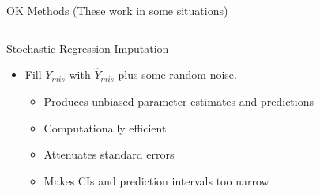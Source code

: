\documentclass{beamer}\usepackage[]{graphicx}\usepackage[]{color}
\makeatletter
\newenvironment{kframe}{%
 \def\at@end@of@kframe{}%
 \ifinner\ifhmode%
  \def\at@end@of@kframe{\end{minipage}}%
  \begin{minipage}{\columnwidth}%
 \fi\fi%
 \def\FrameCommand##1{\hskip\@totalleftmargin \hskip-\fboxsep
 \colorbox{shadecolor}{##1}\hskip-\fboxsep
     \hskip-\linewidth \hskip-\@totalleftmargin \hskip\columnwidth}%
 \MakeFramed {\advance\hsize-\width
   \@totalleftmargin\z@ \linewidth\hsize
   \@setminipage}}%
 {\par\unskip\endMakeFramed%
 \at@end@of@kframe}
\newenvironment{knitrout}{}{} %
\makeatother
\begin{document}
\begin{frame}{OK Methods (These work in some situations)}
  
  \begin{columns}
    \begin{column}{0.5\textwidth}
      
      Stochastic Regression Imputation
      \vc
      \begin{itemize}
      \item Fill $Y_{mis}$ with $\widehat{Y}_{mis}$ plus some random noise.
        \vc
        \begin{itemize}
        \item Produces unbiased parameter estimates and predictions
          \vc
        \item Computationally efficient
          \vc
        \item Attenuates standard errors
          \vc
        \item Makes CIs and prediction intervals too narrow
        \end{itemize}
      \end{itemize}
      
    \end{column}
    \begin{column}{0.5\textwidth}
      
\begin{knitrout}\footnotesize
{}\color{fgcolor}\begin{kframe}


{\ttfamily\noindent\bfseries\color{errorcolor}{Error in check.dataform(data): object 'dat3' not found}}

{\ttfamily\noindent\bfseries\color{errorcolor}{Error in complete(miceS, 1): object 'miceS' not found}}

{\ttfamily\noindent\bfseries\color{errorcolor}{Error in datS[!rVec, ] <- NA: object 'datS' not found}}

{\ttfamily\noindent\bfseries\color{errorcolor}{Error in FUN(X[[i]], ...): object 'dat2' not found}}\end{kframe}


\end{knitrout}
\end{column}
\end{columns}
\end{frame}
\end{document}
